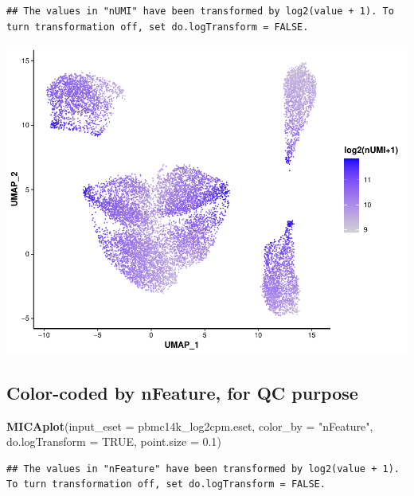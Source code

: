 \documentclass[
  12pt,
]{book}
\newenvironment{Shaded}{\begin{snugshade}}{\end{snugshade}}
\newcommand{\AttributeTok}[1]{\textcolor[rgb]{0.13,0.29,0.53}{#1}}
\newcommand{\ConstantTok}[1]{\textcolor[rgb]{0.56,0.35,0.01}{#1}}
\newcommand{\FloatTok}[1]{\textcolor[rgb]{0.00,0.00,0.81}{#1}}
\newcommand{\FunctionTok}[1]{\textcolor[rgb]{0.13,0.29,0.53}{\textbf{#1}}}
\newcommand{\NormalTok}[1]{#1}
\newcommand{\StringTok}[1]{\textcolor[rgb]{0.31,0.60,0.02}{#1}}
\begin{document}
\begin{verbatim}
## The values in "nUMI" have been transformed by log2(value + 1). To turn transformation off, set do.logTransform = FALSE.
\end{verbatim}

\begin{center}\includegraphics{_main_files/figure-latex/visualize-mica-output-numi-1} \end{center}

\subsection{Color-coded by nFeature, for QC purpose}\label{color-coded-by-nfeature-for-qc-purpose}

\begin{Shaded}
\begin{Highlighting}[]
\FunctionTok{MICAplot}\NormalTok{(}\AttributeTok{input\_eset =}\NormalTok{ pbmc14k\_log2cpm.eset, }\AttributeTok{color\_by =} \StringTok{"nFeature"}\NormalTok{, }\AttributeTok{do.logTransform =} \ConstantTok{TRUE}\NormalTok{, }\AttributeTok{point.size =} \FloatTok{0.1}\NormalTok{)}
\end{Highlighting}
\end{Shaded}

\begin{verbatim}
## The values in "nFeature" have been transformed by log2(value + 1). To turn transformation off, set do.logTransform = FALSE.
\end{verbatim}
\end{document}
